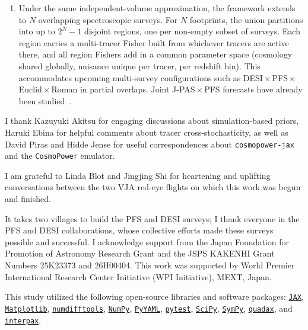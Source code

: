 \documentclass[a4paper,11pt]{article}
\newcommand{\revchange}[1]{{\color{RevisionColor}#1}}
\newcommand{\code}[1]{{\texttt{#1}}}
\begin{document}
\begin{enumerate}
\item \revchange{Under the same independent-volume approximation, the framework
  extends} to \revchange{$N$} overlapping spectroscopic surveys. For \revchange{$N$} footprints, the union partitions
  into up to $2^N{-}1$ disjoint regions, one per non-empty
  subset of surveys\revchange{. Each} region carries a multi-tracer Fisher
  built from whichever tracers are active there, and all region
  Fishers add in a common parameter space (cosmology shared
  globally, nuisance unique per tracer, per redshift bin). This
  accommodates upcoming multi-survey configurations
  such as \revchange{DESI\,$\times$\,PFS\,$\times$\,Euclid\,$\times$\,Roman} in
  partial overlaps. \revchange{Joint J-PAS\,$\times$\,PFS forecasts have already been
  studied~\cite{Qin:2025nkk}.}
\end{enumerate}


\acknowledgments
I thank Kazuyuki Akitsu for engaging discussions about simulation-based priors, Haruki Ebina for helpful comments about tracer cross-stochasticity, as well as David Piras and \revchange{Hidde} Jense for useful correspondences about \texttt{cosmopower-jax} and the \texttt{CosmoPower} emulator.

I am grateful to Linda Blot and Jingjing Shi for heartening and uplifting conversations between the two VJA red-eye flights on which this work was begun and finished.

It takes two villages to build the PFS and DESI surveys; I thank everyone in the PFS and DESI collaborations, whose collective efforts made these surveys possible and successful.
I acknowledge support from the Japan Foundation for Promotion of Astronomy Research Grant and the JSPS KAKENHI Grant Numbers 25K23373 and 26H00404.
This work was supported by World Premier International Research Center Initiative (WPI Initiative), MEXT, Japan.

This study utilized the following open-source libraries and software packages:
\href{https://github.com/google/jax}{\code{JAX}},
\href{https://matplotlib.org/}{\code{Matplotlib}},
\href{https://numdifftools.readthedocs.io/en/master/}{\code{numdifftools}},
\href{https://numpy.org/}{\code{NumPy}},
\href{https://pyyaml.org/}{\code{PyYAML}},
\href{https://docs.pytest.org/}{\code{pytest}},
\href{https://scipy.org/}{\code{SciPy}},
\href{https://www.sympy.org/}{\code{SymPy}},
\href{https://github.com/f0uriest/quadax}{\code{quadax}},
and \href{https://github.com/f0uriest/interpax}{\code{interpax}}.
\end{document}
